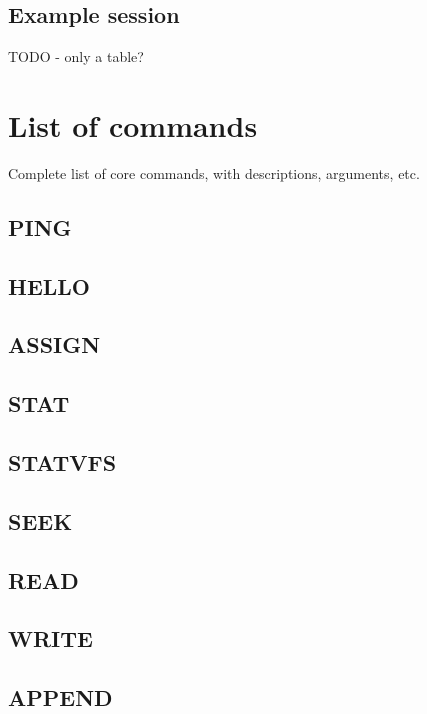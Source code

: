 \subsection{Example session}

TODO - only a table?


\section{List of commands}

Complete list of core commands, with descriptions, arguments, etc.

\subsection{PING}

\subsection{HELLO}

\subsection{ASSIGN}

\subsection{STAT}

\subsection{STATVFS}

\subsection{SEEK}

\subsection{READ}

\subsection{WRITE}

\subsection{APPEND}

